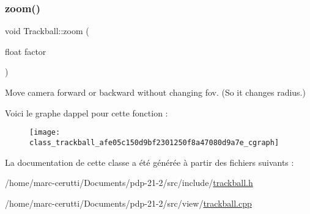 \mbox{\label{class_trackball_afe05c150d9bf2301250f8a47080d9a7e}} 
\subsubsection{\texorpdfstring{zoom()}{zoom()}}
{\footnotesize\ttfamily void Trackball\+::zoom (\begin{DoxyParamCaption}\item[{float}]{factor }\end{DoxyParamCaption})}



Move camera forward or backward without changing fov. (So it changes radius.) 

Voici le graphe d\textquotesingle{}appel pour cette fonction \+:\nopagebreak
\begin{figure}[H]
\begin{center}
\leavevmode
\texttt{[image: class\_trackball\_afe05c150d9bf2301250f8a47080d9a7e\_cgraph]}
\end{center}
\end{figure}


La documentation de cette classe a été générée à partir des fichiers suivants \+:\begin{DoxyCompactItemize}
\item 
/home/marc-\/cerutti/\+Documents/pdp-\/21-\/2/src/include/\hyperlink{trackball_8h}{trackball.\+h}\item 
/home/marc-\/cerutti/\+Documents/pdp-\/21-\/2/src/view/\hyperlink{trackball_8cpp}{trackball.\+cpp}\end{DoxyCompactItemize}
